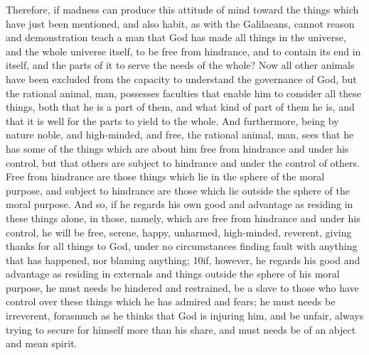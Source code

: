 Therefore, if madness can produce this attitude of mind toward the things which have just been mentioned, and also habit, as with the Galilaeans, cannot reason and demonstration teach a man that God has made all things in the universe, and the whole universe itself, to be free from hindrance, and to contain its end in itself, and the parts of it to serve the needs of the whole? Now all other animals have been excluded from the capacity to understand the governance of God, but the rational animal, man, possesses faculties that enable him to consider all these things, both that he is a part of them, and what kind of part of them he is, and that it is well for the parts to yield to the whole. And furthermore, being by nature noble, and high-minded, and free, the rational animal, man, sees that he has some of the things which are about him free from hindrance and under his control, but that others are subject to hindrance and under the control of others. Free from hindrance are those things which lie in the sphere of the moral purpose, and subject to hindrance are those which lie outside the sphere of the moral purpose. And so, if he regards his own good and advantage as residing in these things alone, in those, namely, which are free from hindrance and under his control, he will be free, serene, happy, unharmed, high-minded, reverent, giving thanks for all things to God, under no circumstances finding fault with anything that has happened, nor blaming anything; 10if, however, he regards his good and advantage as residing in externals and things outside the sphere of his moral purpose, he must needs be hindered and restrained, be a slave to those who have control over these things which he has admired and fears; he must needs be irreverent, forasmuch as he thinks that God is injuring him, and be unfair, always trying to secure for himself more than his share, and must needs be of an abject and mean spirit.

